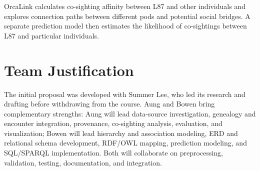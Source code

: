 \documentclass[sigconf]{acmart}
\begin{document}
OrcaLink calculates co-sighting affinity between L87 and other individuals and explores connection paths between different pods and potential social bridges. A separate prediction model then estimates the likelihood of co-sightings between L87 and particular individuals.

\section{Team Justification}

The initial proposal was developed with Summer Lee, who led its research and
drafting before withdrawing from the course. Aung and Bowen bring complementary
strengths: Aung will lead data-source investigation, genealogy and encounter
integration, provenance, co-sighting analysis, evaluation, and visualization;
Bowen will lead hierarchy and association modeling, ERD and relational schema
development, RDF/OWL mapping, prediction modeling, and SQL/SPARQL
implementation. Both will collaborate on preprocessing, validation, testing,
documentation, and integration.



\clearpage


\end{document}
